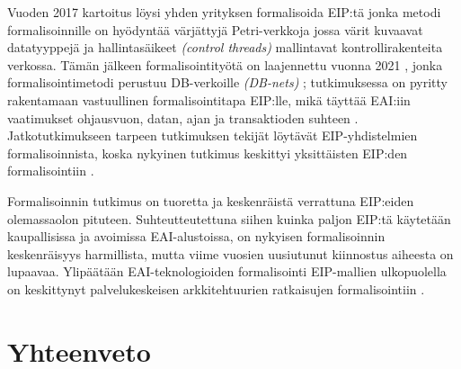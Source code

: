 Vuoden 2017 kartoitus \citep{Ritter2017} löysi yhden yrityksen formalisoida EIP:tä \citep{Fahland2013} jonka metodi formalisoinnille on hyödyntää värjättyjä Petri-verkkoja jossa värit kuvaavat datatyyppejä ja hallintasäikeet \textit{(control threads)} mallintavat kontrollirakenteita verkossa.
Tämän jälkeen formalisointityötä on laajennettu vuonna 2021 \citep{Ritter2021}, jonka formalisointimetodi perustuu DB-verkoille \textit{(DB-nets)} \citep{Montali2017}; tutkimuksessa on pyritty rakentamaan vastuullinen formalisointitapa EIP:lle, mikä täyttää EAI:iin vaatimukset ohjausvuon, datan, ajan ja transaktioden suhteen \citep{Ritter2021}. Jatkotutkimukseen tarpeen tutkimuksen tekijät löytävät EIP-yhdistelmien formalisoinnista, koska nykyinen tutkimus keskittyi yksittäisten EIP:den formalisointiin \citep{Ritter2021}.


Formalisoinnin tutkimus on tuoretta ja keskenräistä verrattuna EIP:eiden olemassaolon pituteen. Suhteutteutettuna siihen kuinka paljon EIP:tä käytetään kaupallisissa ja avoimissa EAI-alustoissa, on nykyisen formalisoinnin keskenräisyys harmillista, mutta viime vuosien uusiutunut kiinnostus aiheesta on lupaavaa. Ylipäätään EAI-teknologioiden formalisointi EIP-mallien ulkopuolella on keskittynyt palvelukeskeisen arkkitehtuurien ratkaisujen formalisointiin \citep{Ritter2017}.





\chapter{Yhteenveto}
